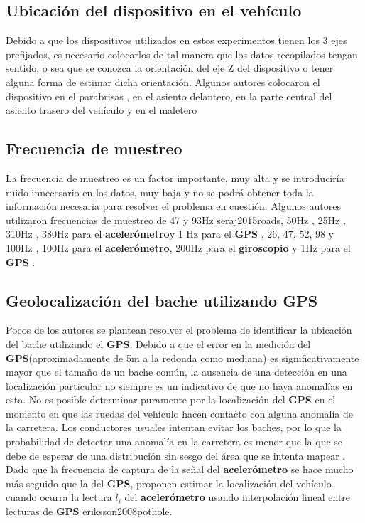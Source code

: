 	\subsection{Ubicación del dispositivo en el vehículo}
		Debido a que los dispositivos utilizados en estos experimentos tienen los 3 ejes prefijados, es necesario colocarlos de tal manera que los
		datos recopilados tengan sentido, o sea que se conozca la orientación del eje Z del dispositivo o tener alguna forma de estimar dicha orientación.
		Algunos autores colocaron el dispositivo en el parabrisas , en el asiento delantero, en la parte
		central del asiento trasero del vehículo y en el maletero 
		
	\subsection{Frecuencia de muestreo}
		La frecuencia de muestreo es un factor importante, muy alta y se introduciría ruido innecesario en los datos, muy baja y no se podrá obtener
		toda la información necesaria para resolver el problema en cuestión. Algunos autores utilizaron frecuencias de muestreo de 47 y 93Hz \brackcite
		{seraj2015roads}, 50Hz , 25Hz , 310Hz , 380Hz para el 
		\textbf{acelerómetro}y 1 Hz para el \textbf{GPS} , 26, 47, 52, 98 y 100Hz , 100Hz para el 
		\textbf{acelerómetro}, 200Hz para el \textbf{giroscopio} y 1Hz para el \textbf{GPS} .

	\subsection{Geolocalización del bache utilizando GPS}
		Pocos de los autores se plantean resolver el problema de identificar la ubicación del bache utilizando el \textbf{GPS}. Debido a que el
		error en la medición del \textbf{GPS}(aproximadamente de 5m a la redonda como mediana) es significativamente mayor que el tamaño de un bache
		común, la ausencia de una detección en una localización particular no siempre es un indicativo de que no haya anomalías en esta. No es
		posible determinar puramente por la localización del \textbf{GPS} en el momento en que las ruedas del vehículo hacen contacto con alguna
		anomalía de la carretera. Los conductores usuales intentan evitar los baches, por lo que la probabilidad de detectar una anomalía en la
		carretera es menor que la que se debe de esperar de una distribución sin sesgo del área que se intenta mapear .
		Dado que la frecuencia de captura de la señal del \textbf{acelerómetro} se hace mucho más seguido que la del \textbf{GPS}, proponen estimar la localización
		del vehículo cuando ocurra la lectura $l_i$ del \textbf{acelerómetro} usando interpolación lineal entre lecturas de \textbf{GPS} \brackcite
		{eriksson2008pothole}.

